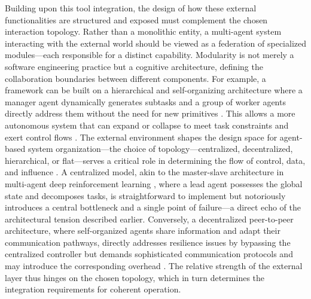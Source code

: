 \documentclass[11pt,a4paper]{article}
\begin{document}
Building upon this tool integration, the design of how these external functionalities are structured and exposed must complement the chosen interaction topology. Rather than a monolithic entity, a multi-agent system interacting with the external world should be viewed as a federation of specialized modules---each responsible for a distinct capability. Modularity is not merely a software engineering practice but a cognitive architecture, defining the collaboration boundaries between different components. For example, a framework can be built on a hierarchical and self-organizing architecture where a manager agent dynamically generates subtasks and a group of worker agents directly address them without the need for new primitives \cite{arxiv:2403.08282v2}. This allows a more autonomous system that can expand or collapse to meet task constraints and exert control flows \cite{arxiv:2409.11393v1}. The external environment shapes the design space for agent-based system organization---the choice of topology---centralized, decentralized, hierarchical, or flat---serves a critical role in determining the flow of control, data, and influence \cite{arxiv:2405.03825v1,arxiv:2310.03659v1}. A centralized model, akin to the master-slave architecture in multi-agent deep reinforcement learning \cite{arxiv:1712.07305v1}, where a lead agent possesses the global state and decomposes tasks, is straightforward to implement but notoriously introduces a central bottleneck and a single point of failure---a direct echo of the architectural tension described earlier. Conversely, a decentralized peer-to-peer architecture, where self-organized agents share information and adapt their communication pathways, directly addresses resilience issues by bypassing the centralized controller but demands sophisticated communication protocols and may introduce the corresponding overhead \cite{arxiv:2402.04578v3}. The relative strength of the external layer thus hinges on the chosen topology, which in turn determines the integration requirements for coherent operation.
\end{document}
